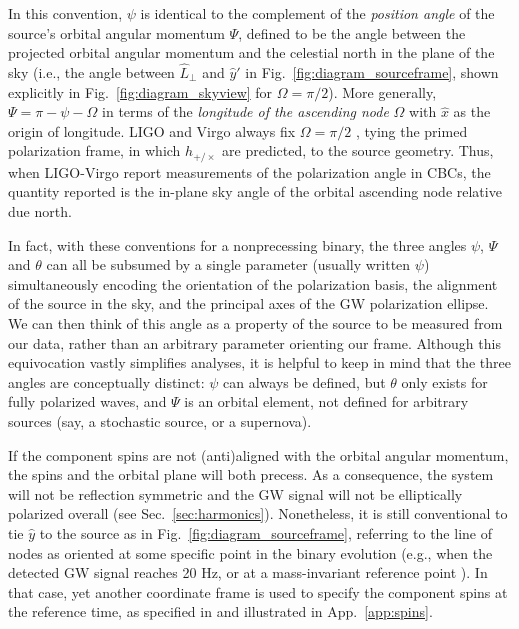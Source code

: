 \documentclass[aps,prd,twocolumn,superscriptaddress,preprintnumbers,floatfix,nofootinbib]{revtex4-2}
\begin{document}
In this convention, $\psi$ is identical to the complement of the \emph{position angle} of the source's orbital angular momentum $\Psi$, defined to be the angle between the projected orbital angular momentum and the celestial north in the plane of the sky (i.e., the angle between $\hat{L}_\perp$ and $\hat{y}'$ in Fig.~\ref{fig:diagram_sourceframe}, shown explicitly in Fig.~\ref{fig:diagram_skyview} for $\Omega=\pi/2$).
More generally, $\Psi = \pi - \psi - \Omega$ in terms of the \emph{longitude of the ascending node} $\Omega$ with $\hat{x}$ as the origin of longitude.
LIGO and Virgo always fix $\Omega = \pi/2$ \cite{LALSuite:source}, tying the primed polarization frame, in which $h_{+/\times}$ are predicted, to the source geometry.
Thus, when LIGO-Virgo report measurements of the polarization angle in CBCs, the quantity reported is the in-plane sky angle of the orbital ascending node relative due north.

In fact, with these conventions for a nonprecessing binary, the three angles $\psi$, $\Psi$ and $\theta$ can all be subsumed by a single parameter (usually written $\psi$) simultaneously encoding the orientation of the polarization basis, the alignment of the source in the sky, and the principal axes of the GW polarization ellipse.
We can then think of this angle as a property of the source to be measured from our data, rather than an arbitrary parameter orienting our frame.
Although this equivocation vastly simplifies analyses, it is helpful to keep in mind that the three angles are conceptually distinct: $\psi$ can always be defined, but $\theta$ only exists for fully polarized waves, and $\Psi$ is an orbital element, not defined for arbitrary sources (say, a stochastic source, or a supernova).

If the component spins are not (anti)aligned with the orbital angular momentum, the spins and the orbital plane will both precess.
As a consequence, the system will not be reflection symmetric and the GW signal will not be elliptically polarized overall (see Sec.~\ref{sec:harmonics}).
Nonetheless, it is still conventional to tie $\hat{y}$ to the source as in Fig.~\ref{fig:diagram_sourceframe}, referring to the line of nodes as oriented at some specific point in the binary evolution (e.g., when the detected GW signal reaches 20 Hz, or at a mass-invariant reference point \cite{Varma:2021csh,Mould:2021xst}).
In that case, yet another coordinate frame is used to specify the component spins at the reference time, as specified in \cite{LALSuite:spins} and illustrated in App.~\ref{app:spins}.
\end{document}
